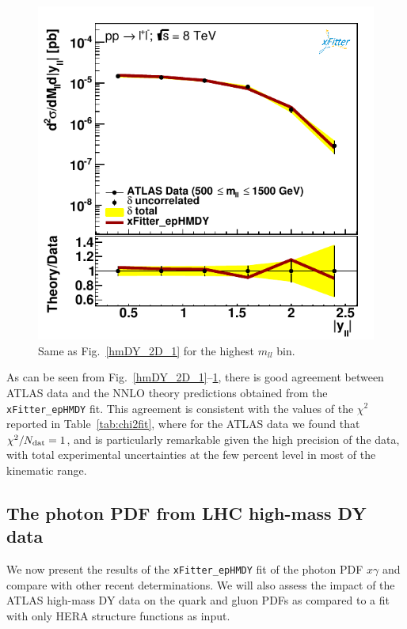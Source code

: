 \begin{figure}[t]
\centering
\includegraphics[width=14cm]{figs/data_405-1.pdf}
\caption{Same as Fig.~\ref{hmDY_2D_1} for the highest $m_{ll}$ bin.
}
\label{hmDY_2D_3}
\end{figure}

As can be seen from Fig.~\ref{hmDY_2D_1}--\ref{hmDY_2D_3}, there
is good agreement between ATLAS data and the NNLO theory
predictions obtained from the {\tt xFitter\_epHMDY} fit.
%
This agreement is consistent with the values of the $\chi^2$ reported in
Table~\ref{tab:chi2fit}, where for the ATLAS data we found
that $\chi^2/N_{\rm dat}=1$, and is particularly remarkable
given the high precision of the data, with total experimental
uncertainties at the few percent level in most of the kinematic range.

\subsection{The photon PDF from LHC high-mass DY data}

We now present the results of the {\tt xFitter\_epHMDY}
fit of the photon PDF $x\gamma$ and compare with
other recent determinations. We will also assess the impact
of the ATLAS high-mass DY data on the quark and gluon PDFs as compared
to a fit with only HERA structure functions as input.

